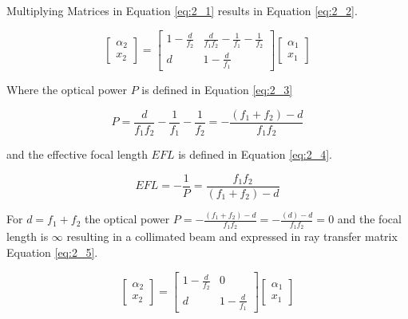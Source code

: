 \documentclass[main.tex]{subfiles}
\begin{document}
Multiplying Matrices in Equation \ref{eq:2_1} results in Equation \ref{eq:2_2}.

\begin{equation}\label{eq:2_2}
\begin{bmatrix}
    \alpha_2 \\
    x_2
\end{bmatrix}
=
\begin{bmatrix}
    1 - \frac{d}{f_2}   &  \frac{d}{f_1 f_2} - \frac{1}{f_1} - \frac{1}{f_2} \\
    d                   &   1 - \frac{d}{f_1}
\end{bmatrix}
\begin{bmatrix}
    \alpha_{1} \\
    x_1
\end{bmatrix}
\end{equation}

Where the optical power $P$ is defined in Equation \ref{eq:2_3}

\begin{equation}\label{eq:2_3}
P = \frac{d}{f_1 f_2} - \frac{1}{f_1} - \frac{1}{f_2} = - \frac{(f_1+f_2)-d}{f_1 f_2}
\end{equation}

and the effective focal length $EFL$ is defined in Equation \ref{eq:2_4}.

\begin{equation}\label{eq:2_4}
EFL = -\frac{1}{P} = \frac{f_1 f_2}{(f_1+f_2)-d}
\end{equation}

For $d = f_1 + f_2$ the optical power $P = - \frac{(f_1+f_2)-d}{f_1 f_2} = - \frac{(d)-d}{f_1 f_2} = 0$ and the focal length is $\infty$ resulting in a collimated beam and expressed in ray transfer matrix Equation \ref{eq:2_5}.

\begin{equation}\label{eq:2_5}
\begin{bmatrix}
    \alpha_2 \\
    x_2
\end{bmatrix}
=
\begin{bmatrix}
    1 - \frac{d}{f_2}   &  0 \\
    d                   &  1 - \frac{d}{f_1}
\end{bmatrix}
\begin{bmatrix}
    \alpha_{1} \\
    x_1
\end{bmatrix}
\end{equation}
\end{document}

